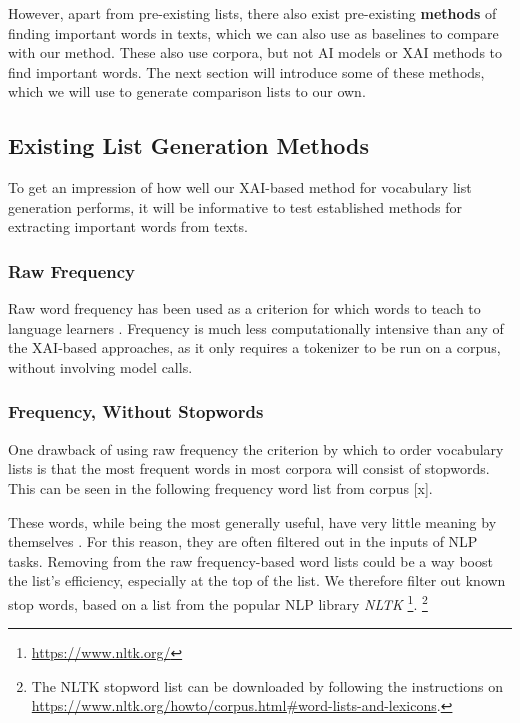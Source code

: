 However, apart from pre-existing lists, there also exist pre-existing \textbf{methods} of finding important words in texts, which we can also use as baselines to compare with our method.
These also use corpora, but not AI models or XAI methods to find important words.
The next section will introduce some of these methods, which we will use to generate comparison lists to our own.


\subsection{Existing List Generation Methods}
To get an impression of how well our XAI-based method for vocabulary list generation performs, it will be informative to test established methods for extracting important words from texts.

\subsubsection{Raw Frequency}

Raw word frequency has been used as a criterion for which words to teach to language learners \cite{heChoosingWordsTeach2019}.
Frequency is much less computationally intensive than any of the XAI-based approaches, as it only requires a tokenizer to be run on a corpus, without involving model calls.

\subsubsection{Frequency, Without Stopwords}
One drawback of using raw frequency the criterion by which to order vocabulary lists is that the most frequent words in most corpora will consist of stopwords.
This can be seen in the following frequency word list from corpus [x].

These words, while being the most generally useful, have very little meaning by themselves \cite{rajaraman2011data}.
For this reason, they are often filtered out in the inputs of NLP tasks.
Removing from the raw frequency-based word lists could be a way boost the list's  efficiency, especially at the top of the list.
We therefore filter out known stop words, based on a list from the popular NLP library \textit{NLTK} \footnote{\url{https://www.nltk.org/}}.
\footnote{The NLTK stopword list can be downloaded by following the instructions on \url{https://www.nltk.org/howto/corpus.html\#word-lists-and-lexicons}.}


